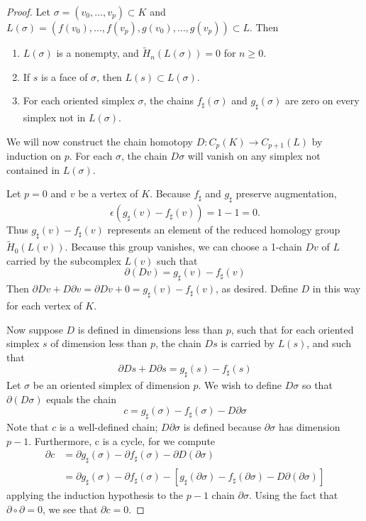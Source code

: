 \documentclass[toc=bib]{scrartcl}
\theoremstyle{plain}
\theoremstyle{definition}
\theoremstyle{remark}
\begin{document}
\begin{proof}
	Let $\sigma=(v_0,\dots, v_p)\subset K$ and $L(\sigma)=(f(v_0),\dots,f(v_p),g(v_0),\dots,g(v_p))\subset L$. Then
	\begin{enumerate}
		\item $L(\sigma)$ is a nonempty, and $\tilde{H}_n(L(\sigma))=0 $ for $n\geq 0$. %
		\item If $s$ is a face of $\sigma$, then $L(s)\subset L(\sigma)$.
		\item For each oriented simplex $\sigma$, the chains $f_\sharp(\sigma)$ and $g_\sharp(\sigma)$ are zero on every simplex not in $L(\sigma)$.
	\end{enumerate}
	
	We will now construct the chain homotopy $D: C_p(K)\to C_{p+1}(L)$ by induction on $p$. For each $\sigma$, the chain $D\sigma$ will vanish on any simplex not contained in $L(\sigma)$.
	
	Let $p=0$ and $v$ be a vertex of $K$. Because $f_\sharp$ and $g_\sharp$ preserve augmentation, \[
	\epsilon(g_\sharp(v)-f_\sharp(v))=1-1=0.
	\]
	Thus $g_\sharp(v)-f_\sharp(v)$ represents an element of the reduced homology group $\tilde{H}_0(L(v))$. %
	Because this group vanishes, we can choose a 1-chain $Dv$ of $L$ carried by the subcomplex $L(v)$ such that
	\[
	\partial(Dv)=g_\sharp(v)-f_\sharp(v)
	\]
	Then $\partial Dv+D\partial v=\partial Dv+0=g_\sharp(v)-f_\sharp(v)$, as desired. Define $D$ in this way for each vertex of $K$.
	
	Now suppose $D$ is defined in dimensions less than $p$, such that for each oriented simplex $s$ of dimension less than $p$, the chain $Ds$ is carried by $L(s)$, and such that 
	\[
	\partial Ds+D\partial s=g_\sharp(s)-f_\sharp(s)
	\]
	Let $\sigma$ be an oriented simplex of dimension $p$. We wish to define $D\sigma$ so that $\partial (D\sigma)$ equals the chain
	\[
	c=g_\sharp(\sigma)-f_\sharp(\sigma)-D\partial\sigma
	\]
	Note that $c$ is a well-defined chain; $D\partial\sigma$ is defined because $\partial \sigma$ has dimension $p-1$. Furthermore, c is a cycle, for we compute
	\begin{align*}
	\partial c&=\partial g_\sharp(\sigma)-\partial f_\sharp(\sigma)-\partial D(\partial \sigma)\\
	&=\partial g_\sharp(\sigma)-\partial f_\sharp(\sigma)-[g_\sharp(\partial\sigma)-f_\sharp(\partial\sigma)-D\partial(\partial\sigma)]
	\end{align*}
	applying the induction hypothesis to the $p-1$ chain $\partial\sigma$. Using the fact that $\partial\circ \partial=0$, we see that $\partial c=0$.
	

\end{proof}
\end{document}
